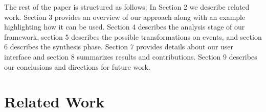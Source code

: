 \documentclass[twoside]{article}
\begin{document}



The rest of the paper is structured as follows: In Section 2 we describe 
related work. Section 3 provides an overview of our 
approach along with an example highlighting how it can be used. Section 4 
describes the analysis stage of our framework, section 5 describes the possible 
transformations on events, and section 6 describes the synthesis phase. 
Section 7 provides details about our user interface and section 8 summarizes results 
and contributions. Section 9 describes our conclusions and directions for future work. 


\section{Related Work}
\end{document}
